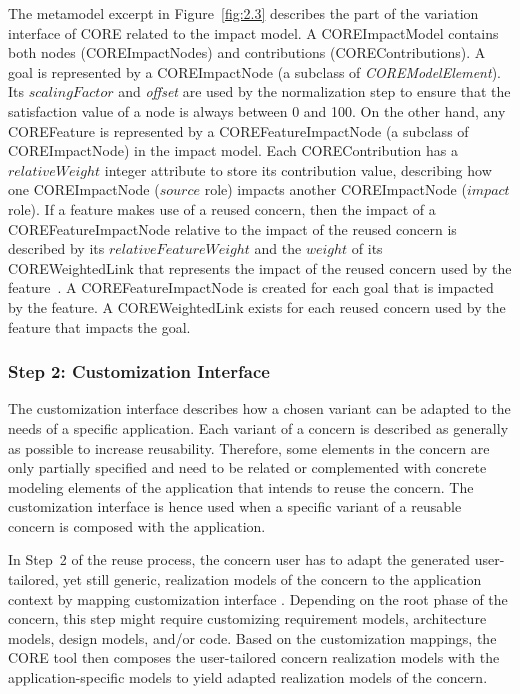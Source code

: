 The metamodel excerpt in Figure~\ref{fig:2.3} describes the part of the variation interface of CORE related to the impact model. A {\cls COREImpactModel} contains both nodes ({\cls COREImpactNode}s) and contributions ({\cls COREContribution}s). A goal is represented by a {\cls COREImpactNode} (a subclass of \textit{\cls COREModelElement}). Its $scalingFactor$ and \emph{offset} are used by the normalization step to ensure that the satisfaction value of a node is always between 0 and 100. On the other hand, any {\cls COREFeature} is represented by a {\cls COREFeatureImpactNode} (a subclass of {\cls COREImpactNode}) in the impact model. Each {\cls COREContribution} has a $relativeWeight$ integer attribute to store its contribution value, describing how one {\cls COREImpactNode} ($source$ role) impacts another {\cls COREImpactNode} ($impact$ role). If a feature makes use of a reused concern, then the impact of a {\cls COREFeatureImpactNode} relative to the impact of the reused concern is described by its $relativeFeatureWeight$ and the $weight$ of its {\cls COREWeightedLink} that represents the impact of the reused concern used by the feature~\cite{duran2015evaluation, alexandre2015support}. A {\cls COREFeatureImpactNode} is created for each goal that is impacted by the feature. A {\cls COREWeightedLink} exists for each reused concern used by the feature that impacts the goal.

\subsubsection{Step 2: Customization Interface}

The customization interface describes how a chosen variant can be adapted to the needs of a specific application. Each variant of a concern is described as generally as possible to increase reusability. Therefore, some elements in the concern are only partially specified and need to be related or complemented with concrete modeling elements of the application that intends to reuse the concern. The customization interface is hence used when a specific variant of a reusable concern is composed with the application.

In Step~2 of the reuse process, the concern user has to adapt the generated user-tailored, yet still generic, realization models of the concern to the application context by mapping  customization interface . Depending on the root phase of the concern, this step might require customizing requirement models, architecture models, design models, and/or code. Based on the customization mappings, the CORE tool then composes the user-tailored concern realization models with the application-specific models to yield adapted realization models of the concern.

